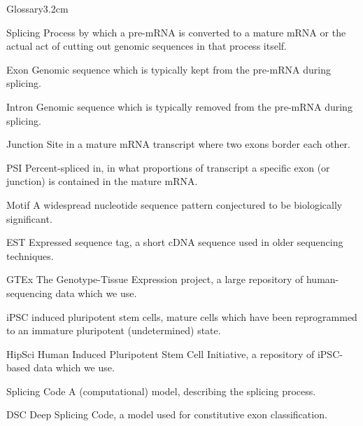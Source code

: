\begin{mclistof}{Glossary}{3.2cm}
\item[Splicing] Process by which a pre-mRNA is converted to a mature mRNA or the actual act of cutting out genomic sequences in that process itself.
\item[Exon] Genomic sequence which is typically kept from the pre-mRNA during splicing.
\item[Intron] Genomic sequence which is typically removed from the pre-mRNA during splicing.
 \item[Junction] Site in a mature mRNA transcript where two exons border each other.
\item[PSI] Percent-spliced in, in what proportions of transcript a specific exon (or junction) is contained in the mature mRNA.
\item[Motif] A widespread nucleotide sequence pattern conjectured to be biologically significant.
\item[EST] Expressed sequence tag, a short cDNA sequence used in older sequencing techniques.
\item[GTEx] The Genotype-Tissue Expression project, a large repository of human-sequencing data which we use.

\item[iPSC] induced pluripotent stem cells, mature cells which have been reprogrammed to an immature pluripotent (undetermined) state.
\item[HipSci] Human Induced Pluripotent Stem Cell Initiative, a repository of iPSC-based data which we use.

\item[Splicing Code] A (computational) model, describing the splicing process.
\item[DSC] Deep Splicing Code, a model used for constitutive exon classification.



\end{mclistof} 
